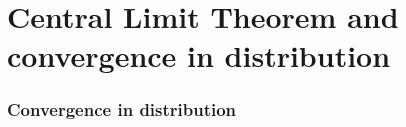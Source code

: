 

\part*{Central Limit Theorem and convergence in distribution}%

\section{Convergence in distribution}


